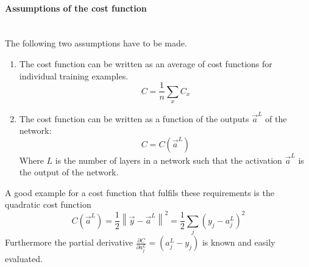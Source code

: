 				\paragraph{Assumptions of the cost function}
					~\\ The following two assumptions have to be made.
					\begin{enumerate}
						\item The cost function can be written as an average of cost functions for individual training examples.
						\begin{equation}
							C = \frac{1}{n} \sum_{x} C_x
							\label{EQ:CostCond1}
						\end{equation}
						\item The cost function can be written as a function of the outputs $\vec{a}^L$ of the network:
						\begin{equation}
							C = C(\vec{a}^L)
						\end{equation}
						Where $L$ is the number of layers in a network such that the activation $\vec{a}^L$ is the output of the network.
					\end{enumerate}
					A good example for a cost function that fulfils these requirements is the quadratic cost function
					\begin{equation}
						C(\vec{a}^L) = \frac{1}{2} \left\| \vec{y} - \vec{a}^L \right\|^2 = \frac{1}{2} \sum_j \left(y_j -a^L_j \right)^2
						\label{EQ:Cost2}
					\end{equation}
					 Furthermore the partial derivative $\frac{\partial C}{\partial a^L_j} = (a^L_j - y_j)$ is known and easily evaluated. 
